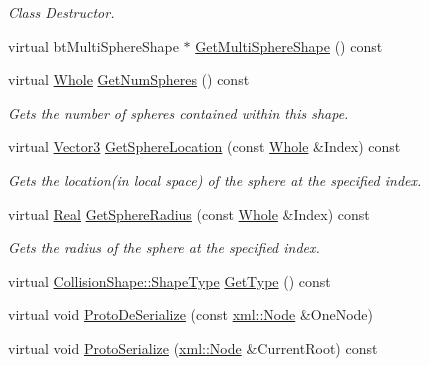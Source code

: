 \begin{DoxyCompactItemize}
\begin{DoxyCompactList}\small\item\em Class Destructor. \item\end{DoxyCompactList}\item 
virtual btMultiSphereShape $\ast$ \hyperlink{classMezzanine_1_1MultiSphereCollisionShape_a760b9d31f64bfc972739325dcaef5902}{GetMultiSphereShape} () const 
\item 
virtual \hyperlink{namespaceMezzanine_adcbb6ce6d1eb4379d109e51171e2e493}{Whole} \hyperlink{classMezzanine_1_1MultiSphereCollisionShape_a5abef10c7df0bf2384c1d64089145ec5}{GetNumSpheres} () const 
\begin{DoxyCompactList}\small\item\em Gets the number of spheres contained within this shape. \item\end{DoxyCompactList}\item 
virtual \hyperlink{classMezzanine_1_1Vector3}{Vector3} \hyperlink{classMezzanine_1_1MultiSphereCollisionShape_a1d568dd2b4641f684b55ba9c249f4ce2}{GetSphereLocation} (const \hyperlink{namespaceMezzanine_adcbb6ce6d1eb4379d109e51171e2e493}{Whole} \&Index) const 
\begin{DoxyCompactList}\small\item\em Gets the location(in local space) of the sphere at the specified index. \item\end{DoxyCompactList}\item 
virtual \hyperlink{namespaceMezzanine_a726731b1a7df72bf3583e4a97282c6f6}{Real} \hyperlink{classMezzanine_1_1MultiSphereCollisionShape_a78e91eae4a3c4e43a295f25a5ca363ef}{GetSphereRadius} (const \hyperlink{namespaceMezzanine_adcbb6ce6d1eb4379d109e51171e2e493}{Whole} \&Index) const 
\begin{DoxyCompactList}\small\item\em Gets the radius of the sphere at the specified index. \item\end{DoxyCompactList}\item 
virtual \hyperlink{classMezzanine_1_1CollisionShape_ad04186055565998879b64176d6dd100d}{CollisionShape::ShapeType} \hyperlink{classMezzanine_1_1MultiSphereCollisionShape_ad4b8a2e2f71686e2495d414a13b0f95a}{GetType} () const 
\item 
virtual void \hyperlink{classMezzanine_1_1MultiSphereCollisionShape_ac933bcaf3025f03b0f7193bf9f894220}{ProtoDeSerialize} (const \hyperlink{classMezzanine_1_1xml_1_1Node}{xml::Node} \&OneNode)
\item 
virtual void \hyperlink{classMezzanine_1_1MultiSphereCollisionShape_a4ff1d5afc23bf6694b01cad56ef17b05}{ProtoSerialize} (\hyperlink{classMezzanine_1_1xml_1_1Node}{xml::Node} \&CurrentRoot) const 
\end{DoxyCompactItemize}
